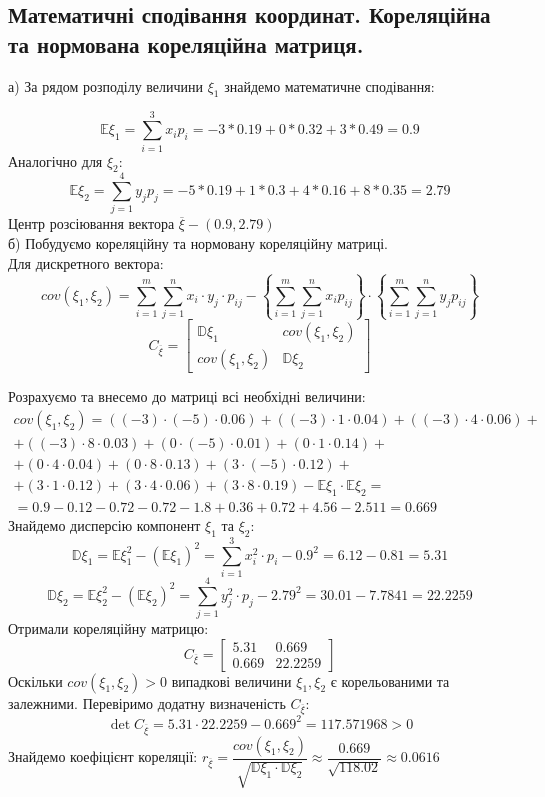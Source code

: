 \documentclass[14pt,a4paper]{scrartcl}
\theoremstyle{definition}
\theoremstyle{remark}
\theoremstyle{definition}
\theoremstyle{definition}
\begin{document}
\subsection{Математичні
сподівання
координат.
Кореляційна
та
нормована кореляційна матриця.}

а) За рядом розподілу величини $\xi_1$ знайдемо математичне сподівання:

$$
\mathbb{E}\xi_1 =  \sum\limits_{i = 1}^{ 3}{ x_i p_{i}} = -3 * 0.19 + 0*0.32 + 3*0.49 =0.9
$$
Аналогічно для $\xi_2$:
$$
\mathbb{E}\xi_2 =  \sum\limits_{j = 1}^{ 4}{ y_j p_{j}} = -5*0.19 + 1*0.3 + 4 * 0.16 + 8*0.35 = 2.79
$$
Центр розсіювання вектора $\overline{\xi} - (0.9, 2.79)$\\
б) Побудуємо кореляційну та нормовану кореляційну матриці.\\
Для дискретного вектора:
$$
cov( \xi_1, \xi_2) = \sum\limits_{i = 1}^{ m}{
 \sum\limits_{j = 1}^{ n}{ x_i \cdot y_j \cdot p_{ij}}
} - \left\lbrace  \sum\limits_{i = 1}^{ m}{
 \sum\limits_{j = 1}^{ n}{ x_i p_{ij}}
} \right\rbrace
\cdot
\left\lbrace \sum\limits_{i = 1}^{ m}{
 \sum\limits_{j = 1}^{ n}{ y_j p_{ij}}
} \right\rbrace
$$
$$
C_{ \overline{\xi}} = \begin{bmatrix}
 \mathbb{D}\xi_1 & cov(\xi_1, \xi_2) \\
 cov(\xi_1, \xi_2) & \mathbb{D} \xi_2
\end{bmatrix}
$$

Розрахуємо та внесемо до матриці всі необхідні величини:
$$
\begin{gathered}
cov(\xi_1, \xi_2)= ( (-3) \cdot (-5) \cdot 0.06 )
+( (-3) \cdot 1 \cdot 0.04 )
+( (-3) \cdot 4 \cdot 0.06 )
+\\+( (-3) \cdot 8 \cdot 0.03 )
+( 0 \cdot (-5) \cdot 0.01 )
+( 0 \cdot 1 \cdot 0.14 )
+\\+( 0 \cdot 4 \cdot 0.04 )
+( 0 \cdot 8 \cdot 0.13 )
+( 3 \cdot (-5) \cdot 0.12 )
+\\+( 3 \cdot 1 \cdot 0.12 )
+( 3 \cdot 4 \cdot 0.06 )
+( 3 \cdot 8 \cdot 0.19 ) - \mathbb{E}\xi_1 \cdot\mathbb{E}\xi_2=\\
= 0.9 -0.12 -0.72 -0.72 -1.8+ 0.36+ 0.72+ 4.56 - 2.511=  0.669
\end{gathered}
$$
Знайдемо дисперсію компонент $\xi_1$ та $\xi_2$:
$$
\mathbb{D}\xi_1 = \mathbb{E}\xi_1^2 - (\mathbb{E}\xi_1)^2 =  \sum\limits_{i = 1}^{ 3}{x_i^2 \cdot p_i} - 0.9^2 =  6.12 - 0.81 = 5.31
$$
$$
\mathbb{D}\xi_2 = \mathbb{E}\xi_2^2 - (\mathbb{E}\xi_2)^2 =  \sum\limits_{j = 1}^{ 4}{y_j^2 \cdot p_j} - 2.79^2 =  30.01 - 7.7841 = 22.2259
$$
Отримали кореляційну матрицю:
$$
C_{\overline{\xi}} = \begin{bmatrix}
 5.31 & 0.669\\
 0.669 & 22.2259
\end{bmatrix}
$$
Оскільки $cov(\xi_1, \xi_2)> 0$ випадкові величини $\xi_1,  \xi_2$ є корельованими та залежними.
Перевіримо додатну визначеність $C_{\overline{\xi}}$:
$$\det C_{\overline{\xi}} =5.31 \cdot 22.2259 - 0.669^2 = 117.571968 >0$$
Знайдемо коефіцієнт кореляції: $r_{\overline{\xi}} = \dfrac{cov(\xi_1, \xi_2)}{\sqrt{\mathbb{D}\xi_1\cdot \mathbb{D}\xi_2}} \approx \dfrac{0.669 }{ \sqrt{118.02}} \approx 0.0616 $
\end{document}
